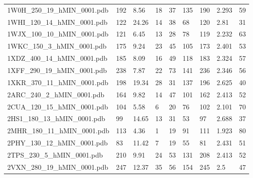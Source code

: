 \documentclass{bioinfo}
\begin{document}
\begin{table}[!t]
{\begin{tabular}{lllllllll}
    1W0H\_250\_19\_hMIN\_0001.pdb & 192      & 8.56       & 18          & 37          & 135         & 190     & 2.293           & 59           \\
    1WHI\_120\_14\_hMIN\_0001.pdb & 122      & 24.26      & 14          & 38          & 68          & 120     & 2.81            & 31           \\
    1WJX\_100\_10\_hMIN\_0001.pdb & 121      & 6.45       & 13          & 28          & 78          & 119     & 2.232           & 63           \\
    1WKC\_150\_3\_hMIN\_0001.pdb & 175      & 9.24       & 23          & 45          & 105         & 173     & 2.401           & 53           \\
    1XDZ\_400\_14\_hMIN\_0001.pdb & 185      & 8.09       & 16          & 49          & 118         & 183     & 2.324           & 57           \\
    1XFF\_290\_19\_hMIN\_0001.pdb & 238      & 7.87       & 22          & 73          & 141         & 236     & 2.346           & 56           \\
    1XKR\_370\_11\_hMIN\_0001.pdb & 198      & 19.34      & 28          & 31          & 137         & 196     & 2.625           & 40           \\
    2ARC\_240\_2\_hMIN\_0001.pdb & 164      & 9.82       & 14          & 47          & 101         & 162     & 2.413           & 52           \\
    2CUA\_120\_15\_hMIN\_0001.pdb & 104      & 5.58       & 6           & 20          & 76          & 102     & 2.101           & 70           \\
    2HS1\_180\_13\_hMIN\_0001.pdb & 99       & 14.65      & 13          & 31          & 53          & 97      & 2.688           & 37           \\
    2MHR\_180\_11\_hMIN\_0001.pdb & 113      & 4.36       & 1           & 19          & 91          & 111     & 1.923           & 80           \\
    2PHY\_130\_12\_hMIN\_0001.pdb & 83       & 11.42      & 7           & 19          & 55          & 81      & 2.431           & 51           \\
    2TPS\_230\_5\_hMIN\_0001.pdb & 210      & 9.91       & 24          & 53          & 131         & 208     & 2.413           & 52           \\
    2VXN\_280\_19\_hMIN\_0001.pdb & 247      & 12.37      & 35          & 56          & 154         & 245     & 2.5             & 47           \\

\end{tabular}}
\end{table}
\end{document}
